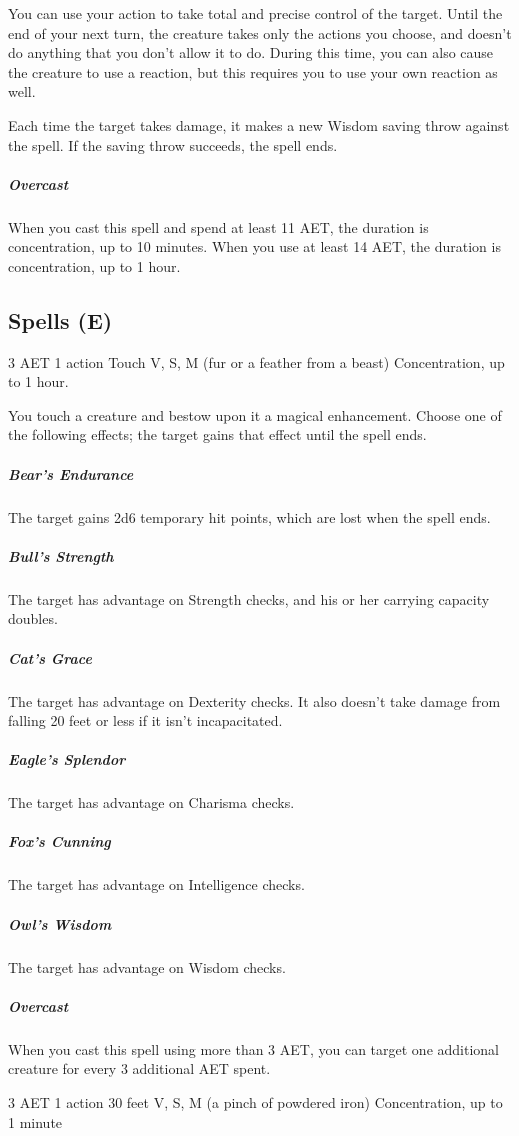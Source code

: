 You can use your action to take total and precise control of the target. Until the end of your next turn, the creature takes only the actions you choose, and doesn't do anything that you don't allow it to do. During this time, you can also cause the creature to use a reaction, but this requires you to use your own reaction as well.

Each time the target takes damage, it makes a new Wisdom saving throw against the spell. If the saving throw succeeds, the spell ends.

\subparagraph*{Overcast} When you cast this spell and spend at least 11 AET, the duration is concentration, up to 10 minutes. When you use at least 14 AET, the duration is concentration, up to 1 hour.

\subsection{Spells (E)}

{3 AET}
{1 action}
{Touch}
{V, S, M (fur or a feather from a beast)}
{Concentration, up to 1 hour.}

You touch a creature and bestow upon it a magical enhancement. Choose one of the following effects; the target gains that effect until the spell ends.

\subparagraph*{Bear's Endurance} The target gains 2d6 temporary hit points, which are lost when the spell ends.

\subparagraph*{Bull's Strength} The target has advantage on Strength checks, and his or her carrying capacity doubles.

\subparagraph*{Cat's Grace} The target has advantage on Dexterity checks. It also doesn't take damage from falling 20 feet or less if it isn't incapacitated.

\subparagraph*{Eagle's Splendor} The target has advantage on Charisma checks.

\subparagraph*{Fox's Cunning} The target has advantage on Intelligence checks.

\subparagraph*{Owl's Wisdom} The target has advantage on Wisdom checks.

\subparagraph*{Overcast} When you cast this spell using more than 3 AET, you can target one additional creature for every 3 additional AET spent.


{3 AET}
{1 action}
{30 feet}
{V, S, M (a pinch of powdered iron)}
{Concentration, up to 1 minute}

